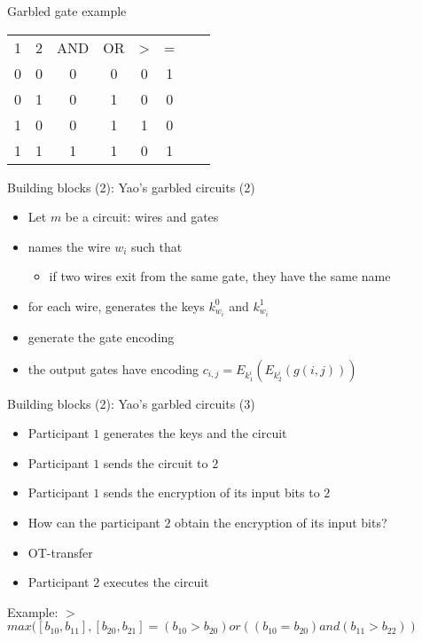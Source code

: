 \documentclass{beamer}
\begin{document}
\begin{frame}{Garbled gate example}
  \begin{tabular}{cccccccc}
    1 & 2 & AND & OR & > & = \\
    0 & 0 & 0   & 0  & 0 & 1 \\
    0 & 1 & 0   & 1  & 0 & 0 \\
    1 & 0 & 0   & 1  & 1 & 0 \\
    1 & 1 & 1   & 1  & 0 & 1 \\
  \end{tabular}
\end{frame}

\begin{frame}{Building blocks (2): Yao's garbled circuits (2)}
  \begin{itemize}
  \item Let $m$ be a circuit: wires and gates
  \item names the wire $w_i$ such that
  \begin{itemize}
    \item if two wires exit from the same gate, they have the same name
  \end{itemize}
  \item for each wire, generates the keys $k^0_{w_i}$ and $k^1_{w_i}$
  \item generate the gate encoding
  \item the output gates have encoding $c_{i,j} =
    E_{k^i_1}(E_{k^i_2}(g(i,j)))$
  \end{itemize}
\end{frame}

\begin{frame}{Building blocks (2): Yao's garbled circuits (3)}
  \begin{itemize}
  \item Participant $1$ generates the keys and the circuit
  \item Participant $1$ sends the circuit to $2$
  \item Participant $1$ sends the encryption of its input bits to $2$
  \item How can the participant $2$ obtain the encryption of its input
    bits?
  \item<2-> OT-transfer
  \item<2-> Participant $2$ executes the circuit
  \end{itemize}
\end{frame}


\begin{frame}{Example: $>$}
  $max([b_{10}, b_{11}], [b_{20}, b_{21}] = (b_{10} > b_{20}) or
  ((b_{10} = b_{20}) and (b_{11} > b_{22}))$
\end{frame}
\end{document}
